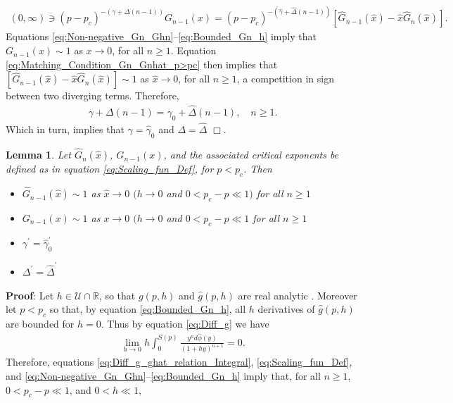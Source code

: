 \documentclass[jmp,graphicx]{revtex4-1}
\newtheorem{lemma}{Lemma}[section]
\newcommand{\ph}{\hat{\phi}}
\newcommand{\gh}{\hat{\gamma}}
\newcommand{\Dh}{\hat{\Delta}}
\newcommand{\xh}{\hat{x}}
\begin{document}
%
\begin{align}\label{eq:Matching_Condition_Gn_Gnhat_p>pc}
  (0,\infty)\ni(p-p_c)^{-(\gamma+\Delta(n-1))}G_{n-1}(x)
       =(p-p_c)^{-(\gh+\Dh(n-1))}[\hat{G}_{n-1}(\xh)-\xh\hat{G}_n(\xh)].
\end{align}
%
Equations \eqref{eq:Non-negative_Gn_Ghn}--\eqref{eq:Bounded_Gn_h}
imply that $G_{n-1}(x)\sim1$ as $x\to0$, for all $n\geq1$. Equation
\eqref{eq:Matching_Condition_Gn_Gnhat_p>pc} then implies that 
$[\hat{G}_{n-1}(\xh)-\xh\hat{G}_n(\xh)]\sim1$ as $\xh\to0$,
for all $n\geq1$, a competition in sign between two diverging
terms. %
Therefore, 
%
\begin{align}
  \gamma+\Delta(n-1)=\gh_0+\Dh(n-1), \quad n\geq1.
\end{align}
%
Which in turn, implies that $\gamma=\gh_0$ and $\Delta=\Dh$ $\Box$.
%
%
 \begin{lemma}\label{lem:asymp_Scaling_funs_x_to_0_p<pc}
   Let $\hat{G}_n(\xh)$, $G_{n-1}(x)$, and the associated critical
   exponents be defined as in equation \eqref{eq:Scaling_fun_Def}, for
   $p<p_c$. Then
     \begin{itemize}
    \item[1)] $\hat{G}_{n-1}(\xh)\sim1$ as $\xh\to0$ $(h\to0$ and $0<p_c-p\ll1)$
      for all $n\geq1$ 
    \item[2)] $G_{n-1}(x)\sim1$ as $x\to0$ $(h\to0$ and $0<p_c-p\ll1$ for all $n\geq1$
    \item[3)] $\gamma^\prime=\gh_0^\prime$  
    \item[4)] $\Delta^\prime=\Dh^\prime$    
     \end{itemize}
 \end{lemma}
%
\noindent \textbf{Proof}:
%
Let $h\in\mathcal{U}\cap\mathbb{R}$, so that $g(p,h)$ and $\hat{g}(p,h)$ are
real analytic \cite{Golden:CMP-473}. Moreover let $p<p_c$ so that, by
equation \eqref{eq:Bounded_Gn_h}, all $h$ derivatives of
$\hat{g}(p,h)$ are bounded for $h=0$. Thus by equation
\eqref{eq:Diff_g} we have   
%
\begin{align*}
  \lim_{h\to0}h \int_0^{S(p)}\frac{y^nd\ph(y)}{(1+hy)^{n+1}}=0.
\end{align*}
%
Therefore, equations \eqref{eq:Diff_g_ghat_relation_Integral}, 
\eqref{eq:Scaling_fun_Def}, and
\eqref{eq:Non-negative_Gn_Ghn}--\eqref{eq:Bounded_Gn_h} imply that,
for all $n\geq1$, $0<p_c-p\ll1$, and $0<h\ll1$,  
\end{document}
